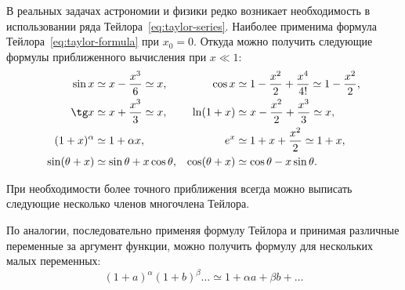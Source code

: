 В реальных задачах астрономии и физики редко возникает необходимость в использовании ряда Тейлора~\eqref{eq:taylor-series}. Наиболее применима формула Тейлора~\eqref{eq:taylor-formula} при $x_0 = 0$. Откуда можно получить следующие формулы приближенного вычисления при $x \ll 1$:
\begin{align*}
	\sin x &\simeq x - \frac{x^3}{6} \simeq x, & 
	\cos x &\simeq 1 - \frac{x^2}{2} + \frac{x^4}{4!} \simeq 1 - \frac{x^2}{2}, \\
	\tg x &\simeq x + \frac{x^3}{3} \simeq x, & 
	\ln(1+x) &\simeq x - \frac{x^2}{2} + \frac{x^3}{3} \simeq x, \\
	(1 + x)^\alpha &\simeq 1 + \alpha x, & 
	e^x &\simeq 1 + x + \frac{x^2}{2} \simeq 1 + x, \\
	\sin (\theta + x) &\simeq \sin \theta + x \cos \theta, & 
	\cos(\theta + x) &\simeq \cos \theta - x \sin \theta.
\end{align*}
\begin{wrapfigure}{r}{0.47\tw}
	\centering
	\vspace{-1pc}
	\caption{}
\end{wrapfigure}
При необходимости более точного приближения всегда можно выписать следующие несколько членов многочлена Тейлора. 

По аналогии, последовательно применяя формулу Тейлора и принимая различные переменные за аргумент функции, можно получить формулу для нескольких малых переменных:
\begin{equation*}
	(1 + a)^\alpha (1 + b)^\beta \ldots \simeq 1 + \alpha a + \beta b + \ldots
\end{equation*}
